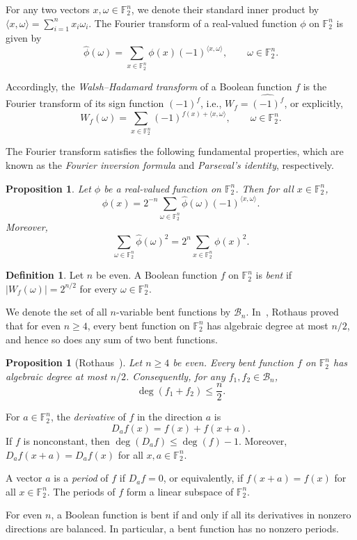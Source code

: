 \documentclass{amsart}
\numberwithin{equation}{section}
\theoremstyle{plain}
\newtheorem{proposition}[equation]{Proposition}
\theoremstyle{definition}
\newtheorem{definition}[equation]{Definition}
\theoremstyle{remark}
\newcommand{\F}{\mathbb{F}_2}
\newcommand{\B}{\mathcal{B}}
\newcommand{\ip}[2]{\langle #1,#2\rangle}
\begin{document}
For any two vectors $x,\omega\in\F^n$, we denote their standard inner product by $\ip{x}{\omega}=\sum_{i=1}^n x_i\omega_i$. The
Fourier transform of a real-valued function $\phi$ on $\F^n$ is given by
\[
 \widehat\phi(\omega)=\sum_{x\in\F^n}\phi(x)(-1)^{\ip{x}{\omega}},
 \qquad \omega\in\F^n.
\]

Accordingly, the \emph{Walsh--Hadamard transform} of a Boolean function $f$ is the Fourier transform of its sign function $(-1)^f$, i.e., $W_f=\widehat{(-1)^f}$, or explicitly,
\[
 W_f(\omega)=\sum_{x\in\F^n}(-1)^{f(x)+\ip{x}{\omega}}, \qquad \omega\in\F^n.
\]

The Fourier transform satisfies the following fundamental properties, which are known as the \emph{Fourier inversion formula} and \emph{Parseval's identity}, respectively.

\begin{proposition}
Let $\phi$ be a real-valued function on $\F^n$. Then for all $x\in\F^n$,
\[
 \phi(x)=2^{-n}\sum_{\omega\in\F^n}\widehat\phi(\omega)(-1)^{\ip{x}{\omega}}.
\]
Moreover,
\[
 \sum_{\omega\in\F^n}\widehat\phi(\omega)^2 = 2^n\sum_{x\in\F^n}\phi(x)^2.
\]
\end{proposition}

\begin{definition}
Let $n$ be even. A Boolean function $f$ on $\F^n$ is \emph{bent} if
$|W_f(\omega)|=2^{n/2}$ for every $\omega\in\F^n$.
\end{definition}
 We denote the set of all $n$-variable bent functions by $\B_n$. In~\cite{rothaus1976}, Rothaus proved that for even $n\ge 4$, every bent function on $\F^n$ has algebraic degree at most $n/2$, and hence so does any sum of two bent functions.
\begin{proposition}[Rothaus~\cite{rothaus1976}]
\label{prop:bent-degree-bound}
Let $n\ge 4$ be even. Every bent function $f$ on $\F^n$
has algebraic degree at most $n/2$. Consequently, for any
$f_1,f_2\in\B_n$,
\[
 \deg(f_1+f_2)\le \frac{n}{2}.
\]
\end{proposition}

For $a\in\F^n$, the \emph{derivative} of $f$ in the direction $a$ is
\[
 D_a f(x)=f(x)+f(x+a).
\]
If $f$ is nonconstant, then $\deg(D_a f)\le\deg(f)-1$.
Moreover, $D_a f(x+a)=D_a f(x)$ for all $x,a\in\F^n$.

A vector $a$ is a \emph{period} of $f$ if $D_a f=0$, or equivalently,
if $f(x+a)=f(x)$ for all $x\in\F^n$.
The periods of $f$ form a linear subspace of $\F^n$.

For even $n$, a Boolean function is bent if and only if all its
derivatives in nonzero directions are balanced. In particular,
a bent function has no nonzero periods.
\end{document}
